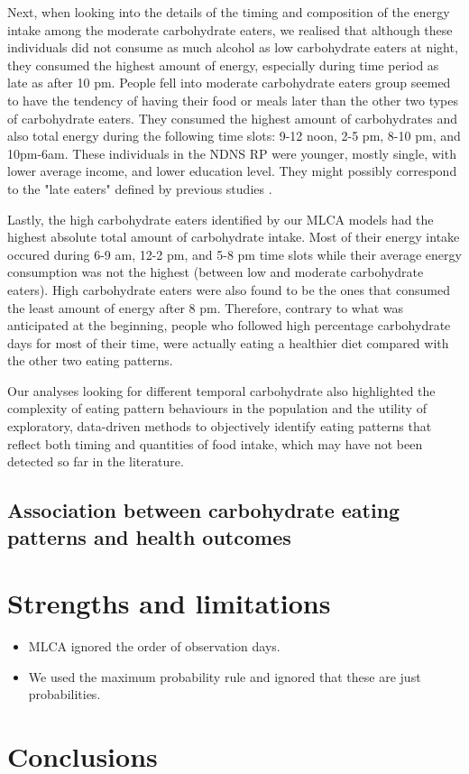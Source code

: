 Next, when looking into the details of the timing and composition of the energy intake among the moderate carbohydrate eaters, we realised that although these individuals did not consume as much alcohol as low carbohydrate eaters at night, they consumed the highest amount of energy, especially during time period as late as after 10 pm. People fell into moderate carbohydrate eaters group seemed to have the tendency of having their food or meals later than the other two types of carbohydrate eaters. They consumed the highest amount of carbohydrates and also total energy during the following time slots: 9-12 noon, 2-5 pm, 8-10 pm, and 10pm-6am. These individuals in the NDNS RP were younger, mostly single, with lower average income, and lower education level. They might possibly correspond to the "late eaters" defined by previous studies \parencite{leech2017temporal, Mansukhani2018}. 

Lastly, the high carbohydrate eaters identified by our MLCA models had the highest absolute total amount of carbohydrate intake. Most of their energy intake occured during 6-9 am, 12-2 pm, and 5-8 pm time slots while their average energy consumption was not the highest (between low and moderate carbohydrate eaters). High carbohydrate eaters were also found to be the ones that consumed the least amount of energy after 8 pm. Therefore, contrary to what was anticipated at the beginning, people who followed high percentage carbohydrate days for most of their time, were actually eating a healthier diet compared with the other two eating patterns. 

Our analyses looking for different temporal carbohydrate also highlighted the complexity of eating pattern behaviours in the population and the utility of exploratory, data-driven methods to objectively identify eating patterns that reflect both timing and quantities of food intake, which may have not been detected so far in the literature.


\subsection{Association between carbohydrate eating patterns and health outcomes}












\section{Strengths and limitations}



\begin{itemize}
	\item MLCA ignored the order of observation days.
	\item We used the maximum probability rule and ignored that these are just probabilities.
\end{itemize}



\section{Conclusions}